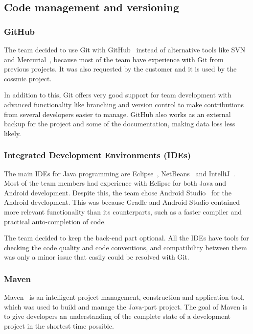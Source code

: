 \subsection{Code management and versioning}
\subsubsection{GitHub}
The team decided to use Git with GitHub~\cite{github} instead of alternative tools like SVN~\cite{svn} and Mercurial~\cite{mercurial}, because most of the team have experience with Git from previous projects. It was also requested by the customer and it is used by the cossmic project. 

In addition to this, Git offers very good support for team development with advanced functionality like branching and version control to make contributions from several developers easier to manage. GitHub also works as an external backup for the project and some of the documentation, making data loss less likely.

\subsubsection{Integrated Development Environments (IDEs)}
The main IDEs for Java programming are Eclipse~\cite{eclipse}, NetBeans~\cite{netbeans} and IntelliJ~\cite{intellij}. Most of the team members had experience with Eclipse for both Java and Android development. Despite this, the team chose Android Studio~\cite{android-studio} for the Android development. This was because Gradle and Android Studio contained more relevant functionality than its counterparts, such as a faster compiler and practical auto-completion of code.%

The team decided to keep the back-end part optional. All the IDEs have tools for checking the code quality and code conventions, and compatibility between them was only a minor issue that easily could be resolved with Git.

\subsubsection{Maven}
Maven~\cite{maven} is an intelligent project management, construction and application tool, which was used to build and manage the Java-part project. The goal of Maven is to give developers an understanding of the complete state of a development project in the shortest time possible.

